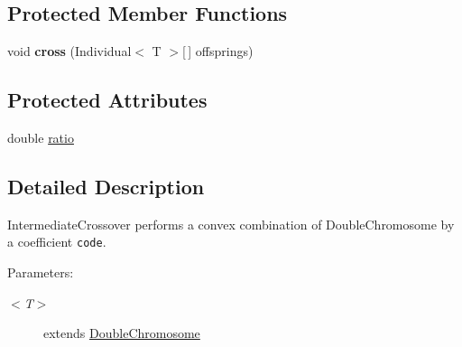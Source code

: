 \subsection*{Protected Member Functions}
\begin{CompactItemize}
\item 
\hypertarget{classjenes_1_1stage_1_1operator_1_1common_1_1_intermediate_crossover_3_01_t_01extends_01_double_chromosome_01_4_712aa913c166a008a0833358270cd483}{
void \textbf{cross} (Individual$<$ T $>$\mbox{[}$\,$\mbox{]} offsprings)}
\label{classjenes_1_1stage_1_1operator_1_1common_1_1_intermediate_crossover_3_01_t_01extends_01_double_chromosome_01_4_712aa913c166a008a0833358270cd483}

\end{CompactItemize}
\subsection*{Protected Attributes}
\begin{CompactItemize}
\item 
double \hyperlink{classjenes_1_1stage_1_1operator_1_1common_1_1_intermediate_crossover_3_01_t_01extends_01_double_chromosome_01_4_00aeef350858cb4ee81f06f7cf7a4c06}{ratio}
\end{CompactItemize}


\subsection{Detailed Description}
IntermediateCrossover performs a convex combination of DoubleChromosome by a coefficient {\tt code}.

\begin{Desc}
\item[Parameters:]
\begin{description}
\item[{\em $<$T$>$}]extends \hyperlink{}{DoubleChromosome} \end{description}
\end{Desc}


